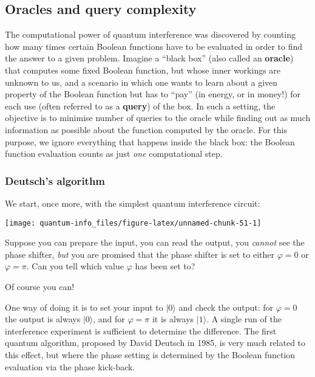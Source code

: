 \documentclass[fleqn]{article}
\begin{document}
\hypertarget{oracles-and-query-complexity}{%
\subsection{Oracles and query complexity}\label{oracles-and-query-complexity}}

The computational power of quantum interference was discovered by counting how many times certain Boolean functions have to be evaluated in order to find the answer to a given problem.
Imagine a ``black box'' (also called an \textbf{oracle}) that computes some fixed Boolean function, but whose inner workings are unknown to us, and a scenario in which one wants to learn about a given property of the Boolean function but has to ``pay'' (in energy, or in money!) for each use (often referred to as a \textbf{query}) of the box.
In such a setting, the objective is to minimise number of queries to the oracle while finding out as much information as possible about the function computed by the oracle.
For this purpose, we ignore everything that happens inside the black box: the Boolean function evaluation counts as just \emph{one} computational step.

\hypertarget{deutschs-algorithm}{%
\subsubsection{Deutsch's algorithm}\label{deutschs-algorithm}}

We start, once more, with the simplest quantum interference circuit:

\begin{center}\texttt{[image: quantum-info\_files/figure-latex/unnamed-chunk-51-1]} \end{center}

Suppose you can prepare the input, you can read the output, you \emph{cannot} see the phase shifter, \emph{but} you are promised that the phase shifter is set to either \(\varphi=0\) or \(\varphi=\pi\).
Can you tell which value \(\varphi\) has been set to?

Of course you can!

One way of doing it is to set your input to \(|0\rangle\) and check the output: for \(\varphi=0\) the output is always \(|0\rangle\), and for \(\varphi=\pi\) it is always \(|1\rangle\).
A single run of the interference experiment is sufficient to determine the difference.
The first quantum algorithm, proposed by David Deutsch in 1985, is very much related to this effect, but where the phase setting is determined by the Boolean function evaluation via the phase kick-back.
\end{document}
